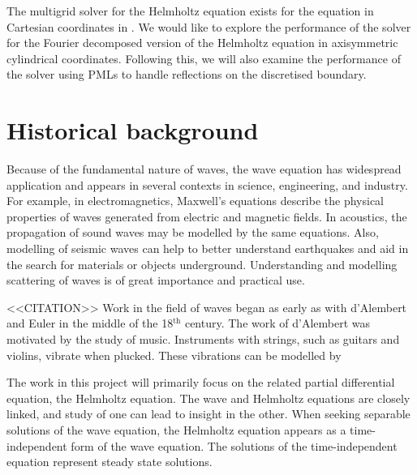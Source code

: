 The multigrid solver for the Helmholtz equation exists for the equation in Cartesian coordinates in \oomph.
We would like to explore the performance of the solver for the Fourier decomposed version of the Helmholtz equation in axisymmetric cylindrical coordinates.
Following this, we will also examine the performance of the solver using PMLs to handle reflections on the discretised boundary.




\section{Historical background}

\iffalse
Motivation.
Who cares? Why is it difficult?
What are the benefits?
Need some citations? Names in the field...
\fi



Because of the fundamental nature of waves, the wave equation has widespread application and appears in several contexts in science, engineering, and industry.
For example, in electromagnetics, Maxwell's equations describe the physical properties of waves generated from electric and magnetic fields.
In acoustics, the propagation of sound waves may be modelled by the same equations.
Also, modelling of seismic waves can help to better understand earthquakes and aid in the search for materials or objects underground.
Understanding and modelling scattering of waves is of great importance and practical use.

<<CITATION>>
Work in the field of waves began as early as with d'Alembert and Euler in the middle of the 18$^\text{th}$ century.
The work of d'Alembert was motivated by the study of music.
Instruments with strings, such as guitars and violins, vibrate when plucked.
These vibrations can be modelled by 



The work in this project will primarily focus on the related partial differential equation, the Helmholtz equation.
The wave and Helmholtz equations are closely linked, and study of one can lead to insight in the other.
When seeking separable solutions of the wave equation, the Helmholtz equation appears as a time-independent form of the wave equation.
The solutions of the time-independent equation represent steady state solutions.

